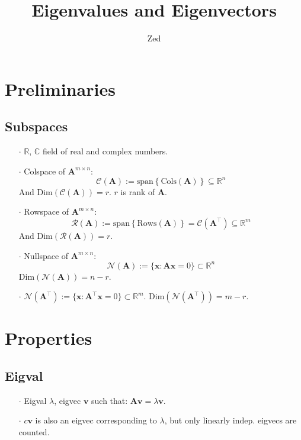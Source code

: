 \documentclass[a4paper, 11pt]{article}
\title{\textbf{Eigenvalues and Eigenvectors}}
\author{Zed}
\begin{document}
\maketitle




\section{Preliminaries}
\subsection{Subspaces}
\begin{itemize}
  \item[$\cdot$] $\mathbb{R}$, $\mathbb{C}$ field of real and complex numbers.
  \item[$\cdot$] Colspace of $\bm{A}^{m\times n}$: 
  $$
  \mathcal{C}(\bm{A}):=\text{span}\left\{\text{Cols}(\bm{A})\right\}\subseteq \mathbb{R}^n
  $$
  And $\text{Dim}(\mathcal{C}(\bm{A}))=r$. $r$ is rank of $\bm{A}$.

  \item[$\cdot$] Rowspace of $\bm{A}^{m\times n}$: 
  $$
  \mathcal{R}(\bm{A}):=\text{span}\left\{\text{Rows}(\bm{A})\right\}=\mathcal{C}(\bm{A}^{\top})\subseteq \mathbb{R}^m
  $$ 
  And $\text{Dim}(\mathcal{R}(\bm{A}))=r$.

  \item[$\cdot$] Nullspace of $\bm{A}^{m\times n}$: 
  $$
  \mathcal{N}(\bm{A}):=\{\bm{x}: \bm{Ax}=0\}\subset \mathbb{R}^n
  $$ 
  $\text{Dim}(\mathcal{N}(\bm{A}))=n-r$.

  \item[$\cdot$] $\mathcal{N}(\bm{A}^{\top}):=\{\bm{x}: \bm{\bm{A}^{\top}x}=0\}\subset \mathbb{R}^m$. $\text{Dim}(\mathcal{N}(\bm{A}^{\top}))=m-r$.
\end{itemize}




\section{Properties}
\subsection{Eigval}
\begin{itemize}
  \item[$\cdot$] Eigval $\lambda$, eigvec $\bm{v}$ such that: $\bm{A} \bm{v} = \lambda \bm{v}$.
  \item[$\cdot$]$c \bm{v}$ is also an eigvec corresponding to $\lambda$, but only linearly indep. eigvecs are counted.
\end{itemize}
\end{document}
